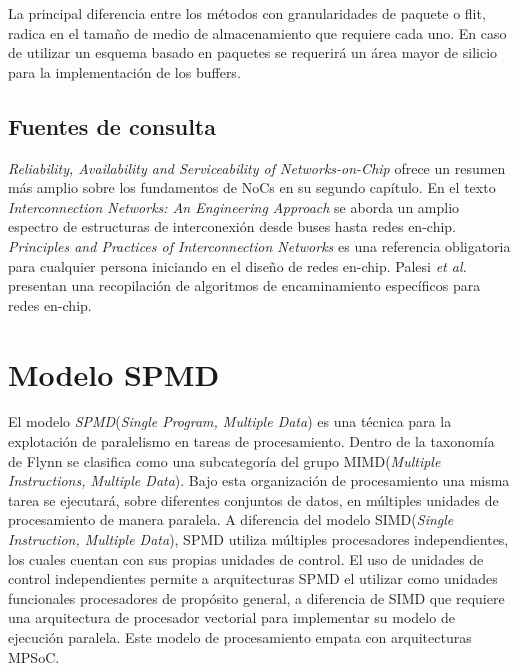 La principal diferencia entre los métodos con granularidades de paquete o flit, radica en el tamaño de medio de almacenamiento que requiere cada uno. En caso de utilizar un esquema basado en paquetes se requerirá un área mayor de silicio para la implementación de los buffers.

\subsection{Fuentes de consulta}

\textit{Reliability, Availability and Serviceability of Networks-on-Chip}\cite{chapter1:cota2011reliability} ofrece un resumen más amplio sobre los fundamentos de NoCs en su segundo capítulo. En el texto \textit{Interconnection Networks: An Engineering Approach}\cite{chapter1:Duato:2002:INE:572400} se aborda un amplio espectro de estructuras de interconexión desde buses hasta redes en-chip. \textit{Principles and Practices of Interconnection Networks}\cite{chapter1:Dally:2003:PPI:995703} es una referencia obligatoria para cualquier persona iniciando en el diseño de redes en-chip. Palesi \textit{et al.}\cite{chapter1:Palesi:2013:RAN:2556370} presentan una recopilación de algoritmos de encaminamiento específicos para redes en-chip.


\section{Modelo SPMD}\label{sec:modelo_spmd}

El modelo \textit{SPMD}\cite{chapter1:192215}(\textit{Single Program, Multiple Data}) es una técnica para la explotación de paralelismo en tareas de procesamiento. Dentro de la taxonomía de Flynn\cite{chapter1:Flynn:1972:COE:1952456.1952459} se clasifica como una subcategoría del grupo MIMD(\textit{Multiple Instructions, Multiple Data}). Bajo esta organización de procesamiento una misma tarea se ejecutará, sobre diferentes conjuntos de datos, en múltiples unidades de procesamiento de manera paralela. A diferencia del modelo SIMD(\textit{Single Instruction, Multiple Data}), SPMD utiliza múltiples procesadores independientes, los cuales cuentan con sus propias unidades de control. El uso de unidades de control independientes permite a arquitecturas SPMD el utilizar como unidades funcionales procesadores de propósito general, a diferencia de SIMD que requiere una arquitectura de procesador vectorial para implementar su modelo de ejecución paralela. Este modelo de procesamiento empata con arquitecturas MPSoC.



